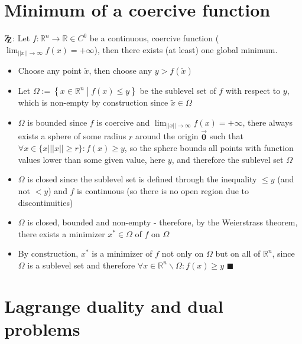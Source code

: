 \documentclass[oneside, a4paper]{book}
\newcommand\abss[1]{\left|\left|#1\right|\right|}
\newcommand\vek[1]{\vec{\bm{#1}}}
\begin{document}
\chapter{Minimum of a coercive function}
$\mathrm{Z\kern-.3em\raise-0.5ex\hbox{Z}}$: Let $f: \mathds{R}^n \to \mathds{R} \in C^0$ be a continuous, coercive function ($\lim_{\abss{x}\to\infty}f(x)=+\infty$), then there exists (at least) one global minimum.

\begin{itemize}
  \item Choose any point $\tilde{x}$, then choose any $y>f(\tilde{x})$
  \item Let $\Omega := \left\{ x \in \mathds{R}^n \middle| f(x) \leq y \right\}$ be the sublevel set of $f$ with respect to $y$, which is non-empty by construction since $\tilde{x}\in\Omega$
  \item $\Omega$ is bounded since $f$ is coercive and $\lim_{\abss{x}\to\infty}f(x)=+\infty$, there always exists a sphere of some radius $r$ around the origin $\vek{0}$ such that $\forall x \in \{x | \abss{x}\geq r\}: f(x) \geq y$, so the sphere bounds all points with function values lower than some given value, here $y$, and therefore the sublevel set $\Omega$
  \item $\Omega$ is closed since the sublevel set is defined through the inequality $\leq y$ (and not $<y$) and $f$ is continuous (so there is no open region due to discontinuities)
  \item $\Omega$ is closed, bounded and non-empty - therefore, by the Weierstrass theorem, there exists a minimizer $x^*\in\Omega$ of $f$ on $\Omega$
  \item By construction, $x^*$ is a minimizer of $f$ not only on $\Omega$ but on all of $\mathds{R}^n$, since $\Omega$ is a sublevel set and therefore $\forall x\in\mathds{R}^n\backslash \Omega: f(x) \geq y$ $\blacksquare$
\end{itemize}

\chapter{Lagrange duality and dual problems}
\end{document}
